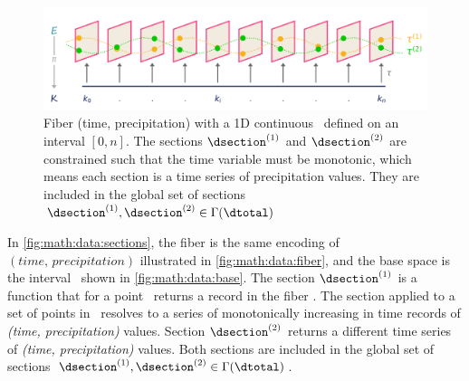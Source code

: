 \documentclass[../main.tex]{subfiles}
\begin{document}
\begin{figure}[H]
    \includegraphics[width=1\linewidth]{figures/math/fiberbundle.png}
    \caption{ Fiber (time, precipitation) with a 1D continuous \dbase\  defined on an interval \(\left[0,n\right]\). The sections \(\dsection^{(1)}\) and \(\dsection^{(2)}\) are constrained such that the time variable must be monotonic, which means each section is a time series of precipitation values. They are included in the global set of sections  \(\dsection^{(1)}, \dsection^{(2)} \in \Gamma(\dtotal)\)}
    \label{fig:math:data:sections}
\end{figure}

In \autoref{fig:math:data:sections}, the fiber is the same encoding of \((time, \, precipitation)\) illustrated in \autoref{fig:math:data:fiber}, and the base space is the interval \dbase\ shown in \autoref{fig:math:data:base}. The section \(\dsection^{(1)}\) is a function that for a point \dbasepoint\ returns a record in the fiber \dfiber. The section applied to a set of points in \dbase\ resolves to a series of monotonically increasing in time records of \textit{(time, precipitation)} values. Section \(\dsection^{(2)}\) returns a different time series of \textit{(time, precipitation)} values. Both sections are included in the global set of sections \(\dsection^{(1)}, \dsection^{(2)} \in \Gamma(\dtotal)\).
\end{document}
